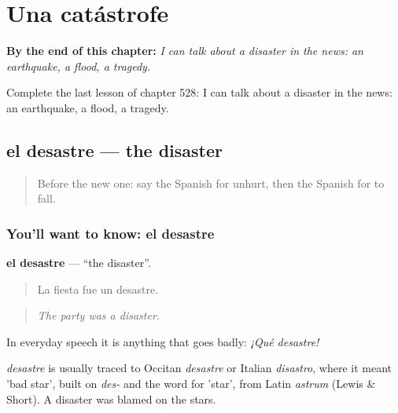 
\chapter{Una catástrofe}
\label{ch:es-una-catastrofe}

\begin{chapteropening}
\textbf{By the end of this chapter:} \emph{I can talk about a disaster in the news: an earthquake, a flood, a tragedy.}

Complete the last lesson of chapter 528: I can talk about a disaster in the news: an earthquake, a flood, a tragedy.
\end{chapteropening}

\section[el desastre]{el desastre — the disaster}

\label{lesson:ES-C528-desastre}



\begin{quote}
Before the new one: say the Spanish for unhurt, then the Spanish for to fall.
\end{quote}

\subsection*{You'll want to know: el desastre}
\textbf{el desastre} — \textquotedblleft{}the disaster\textquotedblright{}.

\begin{quote}
La fiesta fue un desastre.
\end{quote}

\begin{quote}
\emph{The party was a disaster.}
\end{quote}

In everyday speech it is anything that goes badly: \emph{¡Qué desastre!}

\begin{cousinweb}
\emph{desastre} is usually traced to Occitan \emph{desastre} or Italian \emph{disastro}, where it meant 'bad star', built on \emph{des-} and the word for 'star', from Latin \emph{astrum} (Lewis \& Short). A disaster was blamed on the stars.
\end{cousinweb}

